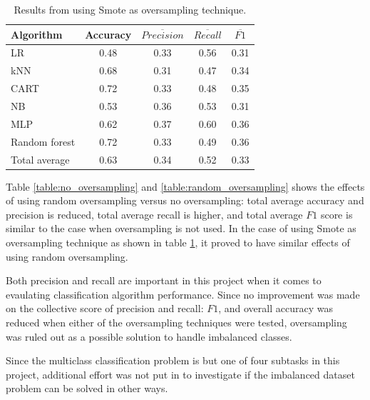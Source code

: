 	\begin{table}[H]
	\centering
	\caption{Results from using Smote as oversampling technique.}
		\begin{tabular}[5]{l | c | c | c | c}
    			Algorithm & Accuracy & $\overline{Precision}$ & $\overline{Recall}$ & $\overline{F1}$ \\
    			\hline
			LR & 0.48 & 0.33 & 0.56 & 0.31 \\
			kNN & 0.68 &  0.31 & 0.47 &  0.34 \\
			CART & 0.72 & 0.33 & 0.48 &  0.35 \\
			NB &  0.53 & 0.36 & 0.53 & 0.31 \\
			MLP & 0.62 & 0.37 & 0.60 & 0.36 \\
			Random forest & 0.72 & 0.33 & 0.49 &  0.36 \\
			\hline
			Total average & 0.63 & 0.34 & 0.52 & 0.33 
			\label{table:smote_oversampling}
		\end{tabular}
	\end{table}
	
	Table \ref{table:no_oversampling} and \ref{table:random_oversampling} shows the effects of using random oversampling versus no oversampling: total average accuracy and precision is reduced, total average recall is higher, and total average $F1$ score is similar to the case when oversampling is not used. In the case of using Smote as oversampling technique as shown in table \ref{table:smote_oversampling}, it proved to have similar effects of using random oversampling. 

	Both precision and recall are important in this project when it comes to evaulating classification algorithm performance. Since no improvement was made on the collective score of precision and recall: $F1$, and overall accuracy was reduced when either of the oversampling techniques were tested, oversampling was ruled out as a possible solution to handle imbalanced classes. 

	Since the multiclass classification problem is but one of four subtasks in this project, additional effort was not put in to investigate if the imbalanced dataset problem can be solved in other ways.
